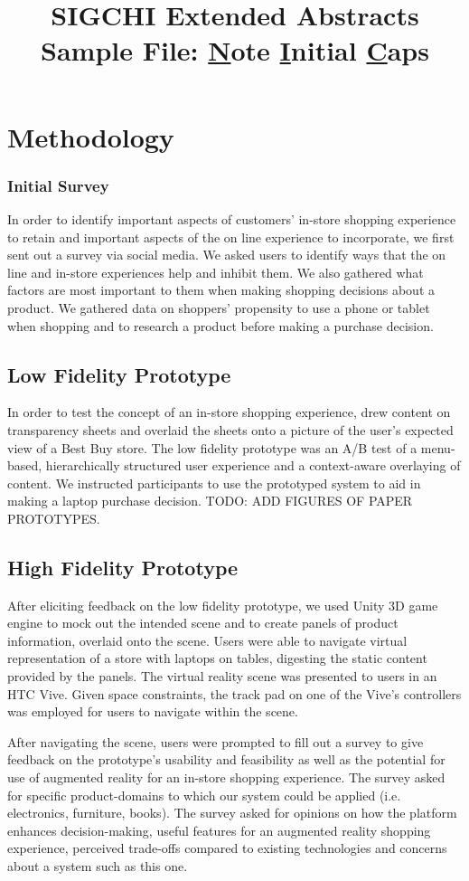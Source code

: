 \documentclass{sigchi-ext}
\begin{document}
\title{SIGCHI Extended Abstracts Sample File: \underline{N}ote
  \underline{I}nitial \underline{C}aps}

\section{Methodology}

\subsubsection{Initial Survey}

In order to identify important aspects of customers' in-store shopping experience to retain and important aspects of the on line experience to incorporate, we first sent out a survey via social media.  We asked users to identify ways that the on line and in-store experiences help and inhibit them.  We also gathered what factors are most important to them when making shopping decisions about a product.  We gathered data on shoppers' propensity to use a phone or tablet when shopping and to research a product before making a purchase decision.

\subsection{Low Fidelity Prototype}

In order to test the concept of an in-store shopping experience, drew content on transparency sheets and overlaid the sheets onto a picture of the user's expected view of a Best Buy store.  The low fidelity prototype was an A/B test of a menu-based, hierarchically structured user experience and a context-aware overlaying of content.  We instructed participants to use the prototyped system to aid in making a laptop purchase decision. TODO: ADD FIGURES OF PAPER PROTOTYPES.

\subsection{High Fidelity Prototype}

After eliciting feedback on the low fidelity prototype, we used Unity 3D game engine to mock out the intended scene and to create panels of product information, overlaid onto the scene.  Users were able to navigate virtual representation of a store with laptops on tables, digesting the static content provided by the panels.  The virtual reality scene was presented to users in an HTC Vive.  Given space constraints, the track pad on one of the Vive's controllers was employed for users to navigate within the scene.

After navigating the scene, users were prompted to fill out a survey to give feedback on the prototype's usability and feasibility as well as the potential for use of augmented reality for an in-store shopping experience.  The survey asked for specific product-domains to which our system could be applied (i.e. electronics, furniture, books).  The survey asked for opinions on how the platform enhances decision-making, useful features for an augmented reality shopping experience, perceived trade-offs compared to existing technologies and concerns about a system such as this one.
\end{document}
